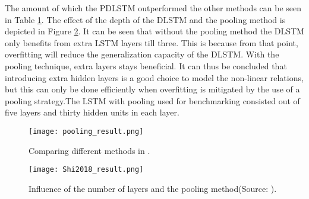 The amount of which the PDLSTM outperformed the other methods can be seen in Table \ref{tab:pooling_result}. The effect of the depth of the DLSTM and the pooling method is depicted in Figure \ref{fig:Shi2018_result}. It can be seen that without the pooling method the DLSTM only benefits from extra LSTM layers till three. This is because from that point, overfitting will reduce the generalization capacity of the DLSTM. With the pooling technique, extra layers stays beneficial. It can thus be concluded that introducing extra hidden layers is a good choice to model the non-linear relations, but this can only be done efficiently when overfitting is mitigated by the use of a pooling strategy.The LSTM with pooling used for benchmarking consisted out of five layers and thirty hidden units in each layer.\\

\begin{figure}[h!]
	\centering
	\texttt{[image: pooling\_result.png]}
	\caption{Comparing different methods in \cite{Shi2018}.}
	\label{tab:pooling_result}
\end{figure}

\begin{figure}[h!]
	\centering
	\texttt{[image: Shi2018\_result.png]}
	\caption{Influence of the number of layers and the pooling method(Source: \cite{Shi2018}).}
	\label{fig:Shi2018_result}
\end{figure}



